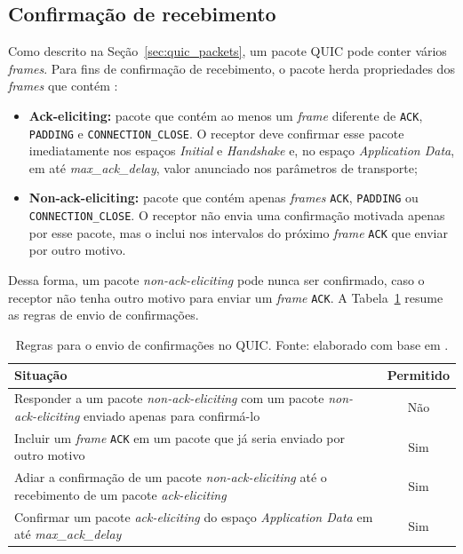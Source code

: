 \subsection{Confirmação de recebimento}
\label{sec:quic_acknowledgement}

Como descrito na Seção~\ref{sec:quic_packets}, um pacote QUIC pode conter vários \textit{frames}. Para fins de confirmação de recebimento, o pacote herda propriedades dos \textit{frames} que contém \citep{rfc9002}:

\begin{itemize}
    \item \textbf{Ack-eliciting:} pacote que contém ao menos um \textit{frame} diferente de \texttt{ACK}, \texttt{PADDING} e \texttt{CONNECTION\_\allowbreak{}CLOSE}. O receptor deve confirmar esse pacote imediatamente nos espaços \textit{Initial} e \textit{Handshake} e, no espaço \textit{Application Data}, em até \textit{max\_\allowbreak{}ack\_\allowbreak{}delay}, valor anunciado nos parâmetros de transporte;
    \item \textbf{Non-ack-eliciting:} pacote que contém apenas \textit{frames} \texttt{ACK}, \texttt{PADDING} ou \texttt{CONNECTION\_\allowbreak{}CLOSE}. O receptor não envia uma confirmação motivada apenas por esse pacote, mas o inclui nos intervalos do próximo \textit{frame} \texttt{ACK} que enviar por outro motivo.
\end{itemize}

Dessa forma, um pacote \textit{non-ack-eliciting} pode nunca ser confirmado, caso o receptor não tenha outro motivo para enviar um \textit{frame} \texttt{ACK}. A Tabela~\ref{tab:quic_ack_rules} resume as regras de envio de confirmações.

\begin{table}[ht]
    \centering
    \begin{tabular}{|p{}|c|}
        \hline
        \textbf{Situação} & \textbf{Permitido} \\
        \hline
        Responder a um pacote \textit{non-ack-eliciting} com um pacote \textit{non-ack-eliciting} enviado apenas para confirmá-lo & Não \\
        \hline
        Incluir um \textit{frame} \texttt{ACK} em um pacote que já seria enviado por outro motivo & Sim \\
        \hline
        Adiar a confirmação de um pacote \textit{non-ack-eliciting} até o recebimento de um pacote \textit{ack-eliciting} & Sim \\
        \hline
        Confirmar um pacote \textit{ack-eliciting} do espaço \textit{Application Data} em até \textit{max\_\allowbreak{}ack\_\allowbreak{}delay} & Sim \\
        \hline
    \end{tabular}
    \caption{Regras para o envio de confirmações no QUIC. Fonte: elaborado com base em \citep{rfc9000}.}
    \label{tab:quic_ack_rules}
\end{table}

